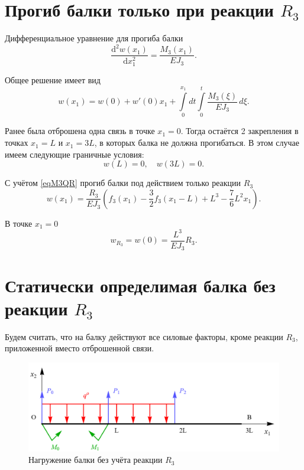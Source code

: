 \documentclass[12pt, a4paper]{article}
\begin{document}
	\section{Прогиб балки только при реакции $R_3$} 
	
	Дифференциальное уравнение для прогиба балки
	\[
	\dfrac{\mathrm{d}^2 w(x_1)}{\mathrm{d} x_1^2} = \dfrac{M_3(x_1)}{E J_3}.
	\]
	
	Общее решение имеет вид
	\vspace{-0.5em}
	\begin{equation}
		w(x_1) = w(0) + w'(0) x_1 + \int\limits_0^{x_1} \! dt \int\limits_0^t \dfrac{M_3(\xi)}{E J_3} \, d \xi.
		\label{eqw}
	\end{equation}
	
	Ранее была отброшена одна связь в точке $x_1 = 0$. Тогда остаётся 2 закрепления в точках $x_1 = L$ и $x_1 = 3L$, в которых балка не должна прогибаться. В этом случае имеем следующие граничные условия:
	\vspace{-0.5em}
	\begin{equation}
		w(L) = 0, \quad w(3L) = 0.
		\label{eqwGU}
	\end{equation}
	
	\vspace{-0.5em}
	
	С учётом \eqref{eqM3QR} прогиб балки под действием только реакции $R_3$
	\begin{equation}
		w(x_1) = \dfrac{R_3}{E J_3} \left( f_3(x_1) - \dfrac{3}{2} f_3(x_1 - L) + L^3 - \dfrac{7}{6} L^2 x_1 \right).
		\label{eqwR}
	\end{equation}
	
	В точке $x_1 = 0$
	\begin{equation}
		w_{R_3} = w(0) = \dfrac{L^3}{E J_3} R_3.
		\label{eqwR3}
	\end{equation}
	
	\newpage
	
	\section{Статически определимая балка без реакции $R_3$} 
	
	Будем считать, что на балку действуют все силовые факторы, кроме реакции $R_3$, приложенной вместо отброшенной связи.
	
	\begin{figure}[!h]
		\centering
		\includegraphics[width=0.75\linewidth]{plot-7}
		\caption{Нагружение балки без учёта реакции $R_3$}
	\end{figure}
	
\end{document}
